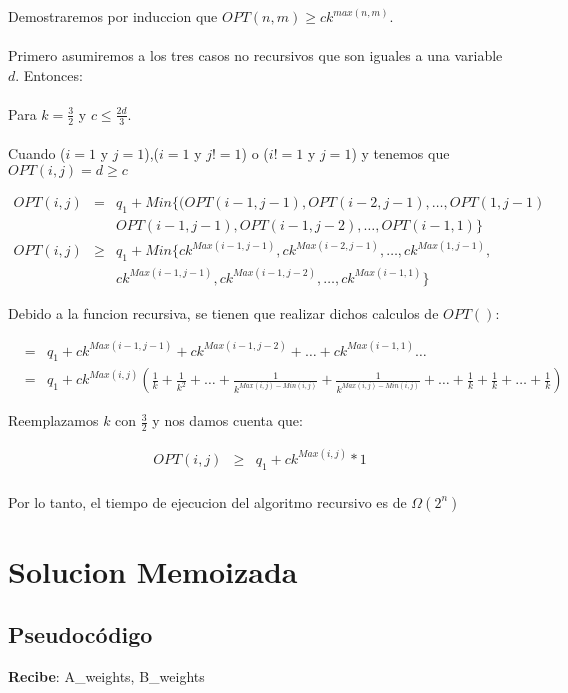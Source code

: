 \documentclass[12pt]{article}
\begin{document}
Demostraremos por induccion que $OPT(n,m)\geq ck^{max(n,m)}$.\\ \\
Primero asumiremos a los tres casos no recursivos que son iguales a una variable $d$. Entonces: \\ \\
Para $k=\frac{3}{2}$ y $c\leq \frac{2d}{3}$.  \\ \\
Cuando ($i=1$ y $j=1$),($i=1$ y $j!=1$) o ($i!=1$ y $j=1$) y  tenemos que $OPT(i,j) = d \geq c$ 


\begin{eqnarray*}
		OPT(i,j)&=&q_1 + Min\{(OPT(i-1,j-1),OPT(i-2,j-1), \dots , OPT(1,j-1) \\
				&&OPT(i-1,j-1),OPT(i-1,j-2), \dots , OPT(i-1,1)\} \\
				OPT(i,j)&\geq&q_1 + Min\{ck^{Max(i-1,j-1)}, ck^{Max(i-2,j-1)}, \dots ,ck^{Max(1,j-1)},\\ 
				&&ck^{Max(i-1,j-1)}, ck^{Max(i-1,j-2)}, \dots , ck^{Max(i-1,1)}\}

\end{eqnarray*}

Debido a la funcion recursiva, se tienen que realizar dichos calculos de $OPT()$:

\begin{eqnarray*}
		&=&q_1 + ck^{Max(i-1,j-1)}+ck^{Max(i-1,j-2)}+ \dots + ck^{Max(i-1,1)} \dots \\
		&=&q_1 + ck^{Max(i,j)}(\frac{1}{k} + \frac{1}{k^2} + \dots + \frac{1}{k^{Max(i,j)-Min(i,j)}}+ \frac{1}{k^{Max(i,j)-Min(i,j)}}+ \dots + \frac{1}{k} + \frac{1}{k} + \dots + \frac{1}{k})

\end{eqnarray*}

Reemplazamos $k$ con $\frac{3}{2}$ y nos damos cuenta que: 

\begin{eqnarray*}
		OPT(i,j)&\geq&q_1+ck^{Max(i,j)}*1\\
\end{eqnarray*}

Por lo tanto, el tiempo de ejecucion del algoritmo recursivo es de $\Omega(2^{n})$
\newpage

\section{Solucion Memoizada}
\subsection{Pseudocódigo}
\textbf{Recibe}: A\_weights, B\_weights
\end{document}
